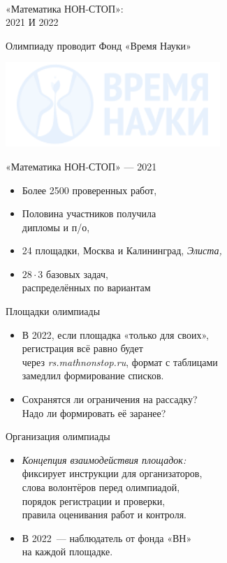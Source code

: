 \documentclass[17pt]{extarticle}
\newcommand{\newslide}[1]{\newpage \begin{center} \large #1 \end{center}}
\begin{document}
\ \\ [1cm]

\begin{center} \Large «Математика НОН-СТОП»:\medskip \\ 2021 И 2022 \end{center}

\newslide{Олимпиаду проводит Фонд «Время Науки»}

\begin{center}
	\includegraphics[height=3.2cm]{fig/vn}
\end{center}

\newslide{«Математика НОН-СТОП» — 2021}

\begin{itemize}
	\item Более 2500 проверенных работ,
	\item Половина участников получила\\ дипломы и п/о,
	\item 24 площадки, Москва и Калининград, {\it Элиста,}
	\item \( 28 \cdot 3\) базовых задач,\\ распределённых по вариантам
\end{itemize}

\newslide{Площадки олимпиады}

\begin{itemize}
	\item В 2022, если площадка «только для своих»,\\
	регистрация всё равно будет\\
	через {\it rs.mathnonstop.ru}, формат с таблицами\\
	замедлил формирование списков.
	\item Сохранятся ли ограничения на рассадку?\\ Надо ли формировать её заранее?
\end{itemize}

\newslide{Организация олимпиады}

\begin{itemize}
	\item {\it Концепция взаимодействия площадок:}\\
	фиксирует инструкции для организаторов,\\
	слова волонтёров перед олимпиадой,\\
	порядок регистрации и проверки,\\
	правила оценивания работ и контроля.
	\item В 2022~— наблюдатель от фонда «ВН»\\
	на каждой площадке.
\end{itemize}
\end{document}
